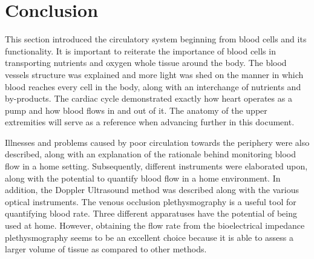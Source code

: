 \section{Conclusion}
This section introduced the circulatory system beginning from blood cells and its functionality. It is important to reiterate the importance of blood cells in transporting nutrients and oxygen whole tissue around the body. The blood vessels structure was explained and more light was shed on the manner in which blood reaches every cell in the body, along with an interchange of nutrients and by-products. The cardiac cycle demonstrated exactly how heart operates as a pump and how blood flows in and out of it. The anatomy of the upper extremities will serve as a reference when advancing further in this document.  

Illnesses and problems caused by poor circulation towards the periphery were also described, along with an explanation of the rationale behind monitoring blood flow in a home setting. Subsequently, different instruments were elaborated upon, along with the potential to quantify blood flow in a home environment. In addition, the Doppler Ultrasound method was described along with the various optical instruments. The venous occlusion plethysmography is a useful tool for quantifying blood rate. Three different apparatuses have the potential of being used at home. However, obtaining the flow rate from the bioelectrical impedance plethysmography seems to be an excellent choice because it is able to assess a larger volume of tissue as compared to other methods.




